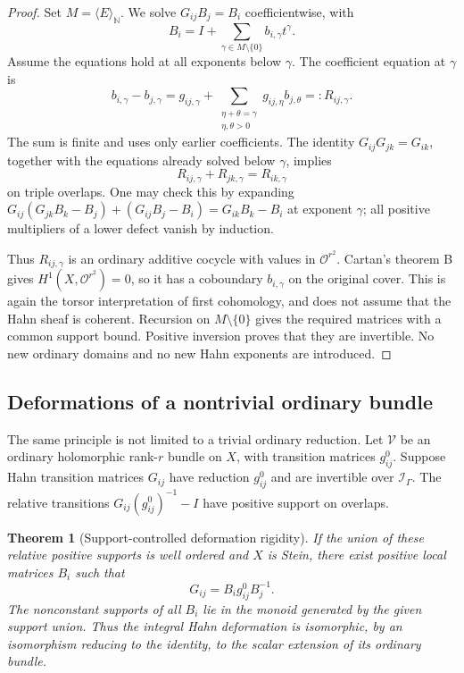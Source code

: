 \documentclass[11pt,letterpaper]{article}
\newtheorem{theorem}{Theorem}[section]
\theoremstyle{definition}
\theoremstyle{remark}
\newcommand{\N}{\mathbb N}
\newcommand{\OO}{\mathcal O}
\newcommand{\II}{\mathscr I_\Gamma}
\newcommand{\angles}[1]{\langle #1\rangle_{\N}}
\numberwithin{equation}{section}
\begin{document}
\begin{proof}
Set $M=\angles E$. We solve $G_{ij}B_j=B_i$ coefficientwise, with
\[
 B_i=I+\sum_{\gamma\in M\setminus\{0\}}b_{i,\gamma}t^\gamma.
\]
Assume the equations hold at all exponents below $\gamma$. The coefficient equation at $\gamma$ is
\begin{equation}\label{eq:Steinrec}
 b_{i,\gamma}-b_{j,\gamma}
 =g_{ij,\gamma}+
  \sum_{\substack{\eta+\theta=\gamma\\\eta,\theta>0}}
     g_{ij,\eta}b_{j,\theta}
 =:R_{ij,\gamma}.
\end{equation}
The sum is finite and uses only earlier coefficients. The identity $G_{ij}G_{jk}=G_{ik}$, together with the equations already solved below $\gamma$, implies
\[
 R_{ij,\gamma}+R_{jk,\gamma}=R_{ik,\gamma}
\]
on triple overlaps. One may check this by expanding $G_{ij}(G_{jk}B_k-B_j)+(G_{ij}B_j-B_i)=G_{ik}B_k-B_i$ at exponent $\gamma$; all positive multipliers of a lower defect vanish by induction.

Thus $R_{ij,\gamma}$ is an ordinary additive cocycle with values in $\OO^{r^2}$. Cartan's theorem B gives $H^1(X,\OO^{r^2})=0$, so it has a coboundary $b_{i,\gamma}$ on the original cover. This is again the torsor interpretation of first cohomology, and does not assume that the Hahn sheaf is coherent. Recursion on $M\setminus\{0\}$ gives the required matrices with a common support bound. Positive inversion proves that they are invertible. No new ordinary domains and no new Hahn exponents are introduced.
\end{proof}

\subsection{Deformations of a nontrivial ordinary bundle}

The same principle is not limited to a trivial ordinary reduction. Let $\mathcal V$ be an ordinary holomorphic rank-$r$ bundle on $X$, with transition matrices $g^0_{ij}$. Suppose Hahn transition matrices $G_{ij}$ have reduction $g^0_{ij}$ and are invertible over $\II$. The relative transitions $G_{ij}(g^0_{ij})^{-1}-I$ have positive support on overlaps.

\begin{theorem}[Support-controlled deformation rigidity]\label{thm:deformation}
If the union of these relative positive supports is well ordered and $X$ is Stein, there exist positive local matrices $B_i$ such that
\begin{equation}\label{eq:deformation}
 G_{ij}=B_i g^0_{ij} B_j^{-1}.
\end{equation}
The nonconstant supports of all $B_i$ lie in the monoid generated by the given support union. Thus the integral Hahn deformation is isomorphic, by an isomorphism reducing to the identity, to the scalar extension of its ordinary bundle.
\end{theorem}
\end{document}
